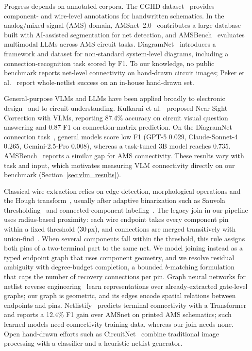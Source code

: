 \documentclass[journal]{IEEEtran}
\begin{document}
Progress depends on annotated corpora. The CGHD dataset~\cite{bayer2021cghd,cghd1152data} provides component- and wire-level annotations for handwritten schematics. In the analog/mixed-signal (AMS) domain, AMSnet~2.0~\cite{amsnet2025} contributes a large database built with AI-assisted segmentation for net detection, and AMSBench~\cite{amsbench2025} evaluates multimodal LLMs across AMS circuit tasks. DiagramNet~\cite{diagramnet2026} introduces a framework and dataset for non-standard system-level diagrams, including a connection-recognition task scored by F1. To our knowledge, no public benchmark reports net-level connectivity on hand-drawn circuit images; Peker et al.~\cite{peker2026} report whole-netlist success on an in-house hand-drawn set.

General-purpose VLMs and LLMs have been applied broadly to electronic design~\cite{llm4eda2024} and to circuit understanding. Kulkarni et al.~\cite{kulkarni2025enhancing} proposed Near Sight Correction with VLMs, reporting 87.4\% accuracy on circuit visual question answering and 0.87 F1 on connection-matrix prediction. On the DiagramNet connection task~\cite{diagramnet2026}, general models score low F1 (GPT-5 0.029, Claude-Sonnet-4 0.265, Gemini-2.5-Pro 0.008), whereas a task-tuned 3B model reaches 0.735. AMSBench~\cite{amsbench2025} reports a similar gap for AMS connectivity. These results vary with task and input, which motivates measuring VLM connectivity directly on our benchmark (Section~\ref{sec:vlm_results}).

Classical wire extraction relies on edge detection, morphological operations and the Hough transform~\cite{duda1972hough}, usually after adaptive binarization such as Sauvola thresholding~\cite{sauvola2000} and connected-component labeling~\cite{he2017ccl}. The legacy join in our pipeline uses radius-based proximity: each wire endpoint takes every component pin within a fixed threshold (30\,px), and connections are merged transitively with union-find~\cite{tarjan1975union}. When several components fall within the threshold, this rule assigns both pins of a two-terminal part to the same net. We model joining instead as a typed endpoint graph that uses component geometry, and we resolve residual ambiguity with degree-budget completion, a bounded $b$-matching formulation~\cite{kuhn1955,schrijver2003combinatorial} that caps the number of recovery connections per pin. Graph neural networks for netlist reverse engineering~\cite{alrahis2021gnn} learn representations over already-extracted gate-level graphs; our graph is geometric, and its edges encode spatial relations between endpoints and pins. Netlistify~\cite{netlistify2025} predicts terminal connectivity with a Transformer and reports a 12.4\% F1 gain over AMSnet on printed AMS schematics; such learned models need connectivity training data, whereas our join needs none. Open hand-drawn efforts such as CircuitNet~\cite{circuitnet} combine traditional image processing with a classifier and a heuristic netlist generator.
\end{document}
